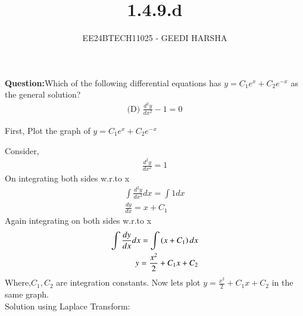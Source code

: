 \documentclass[journal]{IEEEtran}
\begin{document}

\vspace{3cm}
\title{1.4.9.d}
\author{EE24BTECH11025 - GEEDI HARSHA}
{\let\newpage\relax\maketitle}

\renewcommand{\thefigure}{\theenumi}
\renewcommand{\thetable}{\theenumi}
\setlength{\intextsep}{10pt} %


\renewcommand{\thetable}{\theenumi}

\textbf{Question:}Which of the following differential equations has $y = C_1 e^x + C_2 e^{-x}$ as the general solution?\\

\begin{align}
\text{(D) } \frac{d^2y}{dx^2} - 1 = 0
\end{align}



\solution

First, Plot the graph of $y = C_1 e^x + C_2 e^{-x}$

Consider,
\begin{align}
\frac{d^2y}{dx^2} = 1 \label{2}
\end{align}
On integrating both sides w.r.to x
\begin{align}
\int \frac{d^2y}{dx^2} dx = \int 1 dx \\
\frac{dy}{dx} = x + C_1
\end{align}
Again integrating on both sides w.r.to x
\begin{align}
\int \frac{dy}{dx} dx = \int \left(x + C_1\right) dx \\
y = \frac{x^2}{2}+C_1x+C_2
\end{align}
Where,$C_1,C_2$ are integration constants.
Now lets plot $y = \frac{x^2}{2}+C_1x+C_2 $ in the same graph.\\ 

Solution using Laplace Transform:\\
\end{document}
